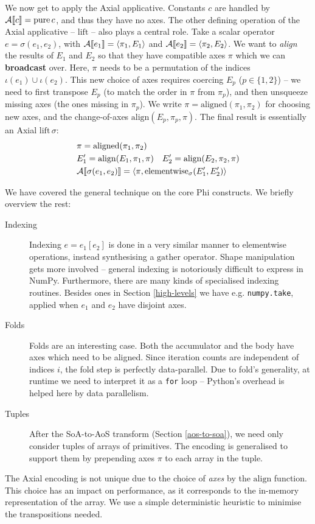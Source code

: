 We now get to apply the Axial applicative. Constants $c$ are handled by $\mathcal A \denot{c} = \mathrm{pure}\,c $, and thus they have no axes.
The other defining operation of the Axial applicative -- $\mathrm{lift}$ -- also plays a central role. 
Take a scalar operator $e = \sigma(e_1, e_2)$, with $\mathcal A \denot{e_1} = \phipair{\pi_{1}}{E_1}$ and $\mathcal A \denot{e_2} = \phipair{\pi_{2}}{E_2}$. 
We want to \textit{align} the results of $E_1$ and $E_2$ so that they have compatible axes $\pi$ which we can \textbf{broadcast} over. 
Here, $\pi$ needs to be a permutation of the indices $\iota(e_1) \cup \iota(e_2)$. 
This new choice of axes requires coercing $E_p$ ($p \in \{1, 2\}$) -- we need to first transpose $E_p$ (to match the order in $\pi$ from $\pi_{p}$), and then unsqueeze missing axes (the ones missing in $\pi_{p}$). 
We write $\pi = \mathrm{aligned}(\pi_{1}, \pi_{2})$ for choosing new axes, and the change-of-axes $\mathrm{align}(E_p, \pi_{p}, \pi)$. The final result is essentially an Axial $\mathrm{lift}\,\sigma$:
\begin{align*}
\begin{split}
&\pi = \mathrm{aligned}(\pi_{1}, \pi_{2}) \\
&E_1' = \mathrm{align}(E_1, \pi_{1}, \pi) \quad E_2' = \mathrm{align}(E_2, \pi_{2}, \pi) \\
&\mathcal A \denot{\sigma(e_1, e_2)} = \left\langle \pi, \mathrm{elementwise}_{\sigma}(E_1', E_2') \right\rangle 
\end{split}
\end{align*}

\needspace{4em}
We have covered the general technique on the core Phi constructs. We briefly overview the rest:
\begin{description}
    \item[Indexing] Indexing $e = e_1[e_2]$ is done in a very similar manner to elementwise operations, instead synthesising a $\mathrm{gather}$ operator. Shape manipulation gets more involved -- general indexing is notoriously difficult to express in NumPy. Furthermore, there are many kinds of specialised indexing routines. Besides ones in Section \ref{high-levels} we have e.g. \texttt{numpy.take}, applied when $e_1$ and $e_2$ have disjoint axes.
    \item[Folds] Folds are an interesting case. Both the accumulator and the body have axes which need to be aligned. Since iteration counts are independent of indices $i$, the fold step is perfectly data-parallel. Due to fold's generality, at runtime we need to interpret it as a \texttt{for} loop -- Python's overhead is helped here by data parallelism.
    \item[Tuples] After the SoA-to-AoS transform (Section \ref{aos-to-soa}), we need only consider tuples of arrays of primitives. The encoding is generalised to support them by prepending axes $\pi$ to each array in the tuple.  
\end{description}
The Axial encoding is not unique due to the choice of \textit{axes} by the $\mathrm{align}$ function. This choice has an impact on performance, as it corresponds to the in-memory representation of the array. We use a simple deterministic heuristic to minimise the transpositions needed. 


